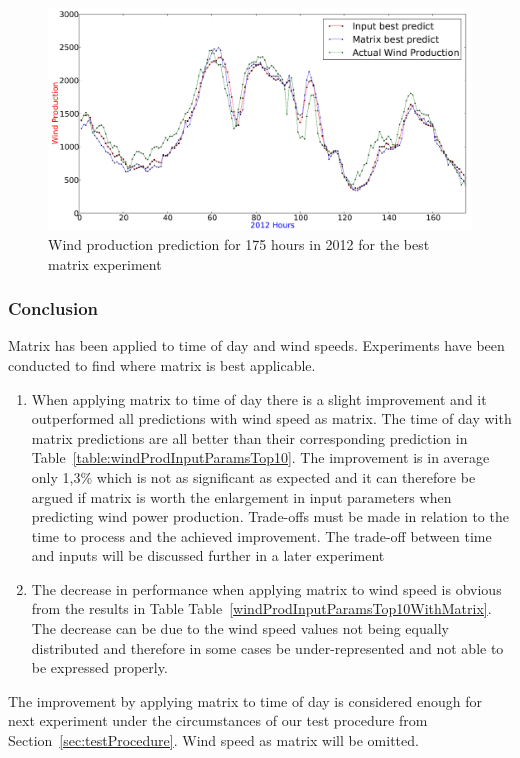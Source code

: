 \begin{figure}[h!]
\centering
\includegraphics[width=0.99\linewidth]{billeder/bestMatrixGraph.png}
\caption{Wind production prediction for 175 hours in 2012 for the best matrix experiment}
\label{fig:bestMatrixGraph}
\end{figure}   

\subsubsection{Conclusion}
Matrix has been applied to time of day and wind speeds. Experiments have been conducted to find where matrix is best applicable.

\begin{enumerate}
\item When applying matrix to time of day there is a slight improvement and it outperformed all predictions with wind speed as matrix. The time of day with matrix predictions are all better than their corresponding prediction in Table~\ref{table:windProdInputParamsTop10}. The improvement is in average only 1,3\% which is not as significant as expected and it can therefore be argued if matrix is worth the enlargement in input parameters when predicting wind power production. Trade-offs must be made in relation to the time to process and the achieved improvement. The trade-off between time and inputs will be discussed further in a later experiment 
\item The decrease in performance when applying matrix to wind speed is obvious from the results in Table Table~\ref{windProdInputParamsTop10WithMatrix}. The decrease can be due to the wind speed values not being equally distributed and therefore in some cases be under-represented and not able to be expressed properly.  
\end{enumerate}

The improvement by applying matrix to time of day is considered enough for next experiment under the circumstances of our test procedure from Section~\ref{sec:testProcedure}. Wind speed as matrix will be omitted.

